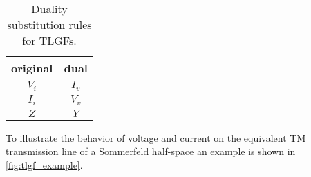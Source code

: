 \begin{table}[hbt]
	\centering
	\begin{tabular}{cc}
		\toprule%
		\textbf{original} & \textbf{dual}\\ \midrule
		$V_i$ & $I_v$ \\
		$I_i$ & $V_v$ \\
		$Z$ & $Y$ \\
		\bottomrule
	\end{tabular}
	\caption{Duality substitution rules for \acp{TLGF}.}
	\label{tab:tlgf_duality}
\end{table}








To illustrate the behavior of voltage and current on the equivalent
\ac{TM} transmission line of a Sommerfeld half-space an example is shown in
\cref{fig:tlgf_example}.

